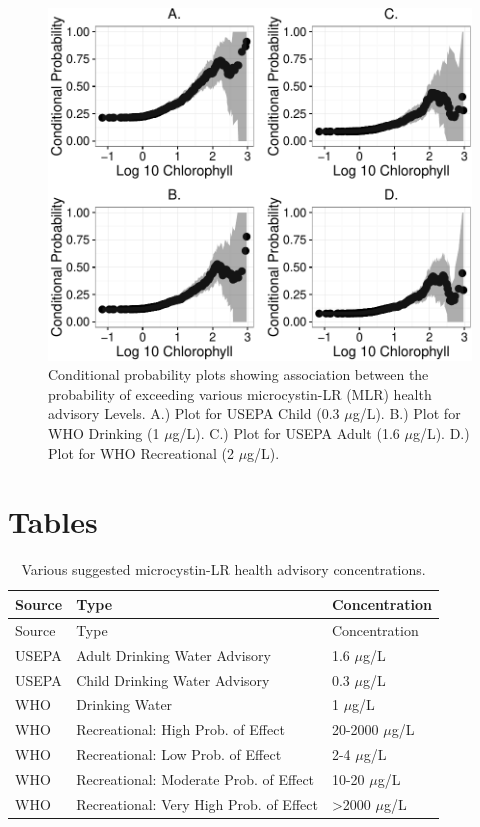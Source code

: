 \documentclass[10pt,a4paper,twocolumn]{article}
\begin{document}
\newpage

\begin{figure}[htbp]
\centering
\includegraphics{manuscript_files/figure-latex/epa_child_cp_plot-1.pdf}
\caption{Conditional probability plots showing association between the
probability of exceeding various microcystin-LR (MLR) health advisory
Levels. A.) Plot for USEPA Child (0.3 \(\mu\)g/L). B.) Plot for WHO
Drinking (1 \(\mu\)g/L). C.) Plot for USEPA Adult (1.6 \(\mu\)g/L). D.)
Plot for WHO Recreational (2 \(\mu\)g/L). \label{fig:multi_cp_plot}}
\end{figure}

\newpage

\section{Tables}\label{tables}

\begin{longtable}[c]{@{}lll@{}}
\caption{Various suggested microcystin-LR health advisory
concentrations. \label{tab:microcystin_levels}}\tabularnewline
\toprule
Source & Type & Concentration\tabularnewline
\midrule
\endfirsthead
\toprule
Source & Type & Concentration\tabularnewline
\midrule
\endhead
USEPA & Adult Drinking Water Advisory & 1.6 \(\mu\)g/L\tabularnewline
USEPA & Child Drinking Water Advisory & 0.3 \(\mu\)g/L\tabularnewline
WHO & Drinking Water & 1 \(\mu\)g/L\tabularnewline
WHO & Recreational: High Prob. of Effect & 20-2000
\(\mu\)g/L\tabularnewline
WHO & Recreational: Low Prob. of Effect & 2-4 \(\mu\)g/L\tabularnewline
WHO & Recreational: Moderate Prob. of Effect & 10-20
\(\mu\)g/L\tabularnewline
WHO & Recreational: Very High Prob. of Effect & \textgreater{}2000
\(\mu\)g/L\tabularnewline
\bottomrule
\end{longtable}
\end{document}
